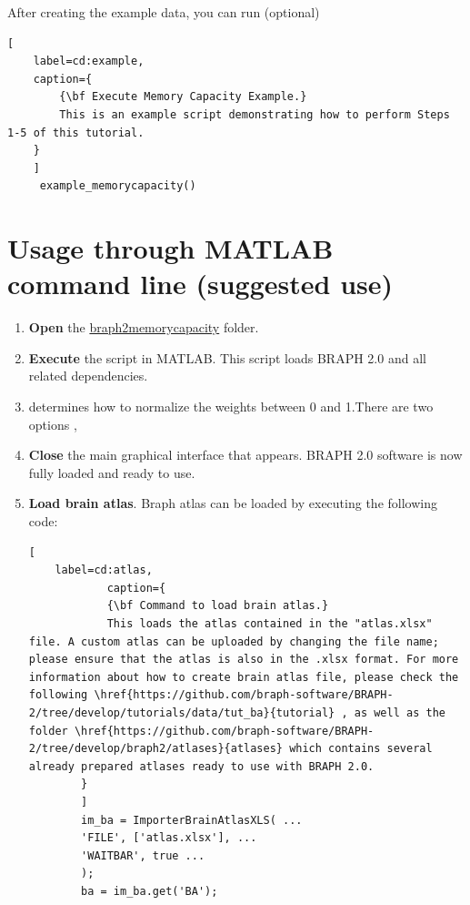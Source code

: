 \documentclass[justified]{tufte-handout}
\begin{document}
After creating the example data, you can run  (optional)

\begin{lstlisting}[
	label=cd:example,
	caption={
		{\bf Execute Memory Capacity Example.}
		This is an example script demonstrating how to perform Steps 1-5 of this tutorial.
	}
	]
	 example_memorycapacity()
\end{lstlisting}

\section{Usage through MATLAB command line (suggested use)}
\begin{enumerate}
	
	\item {\bf Open} the \href{https://github.com/braph-software/MemoryCapacity/tree/develop/braph2memorycapacity}{braph2memorycapacity}  folder.
	
	\item {\bf Execute} the  script in MATLAB. This script loads BRAPH 2.0 and all related dependencies.
	
	\item {} determines how to normalize the weights between 0 and 1.There are two options ,
	
	\item {\bf Close} the main graphical interface that appears. BRAPH 2.0 software is now fully loaded and ready to use.
	
	
	\item{\bf  Load brain atlas}. Braph atlas can be loaded by executing the following code:
	\begin{lstlisting}[
	label=cd:atlas,
			caption={
			{\bf Command to load brain atlas.}
			This loads the atlas contained in the "atlas.xlsx" file. A custom atlas can be uploaded by changing the file name; please ensure that the atlas is also in the .xlsx format. For more information about how to create brain atlas file, please check the following \href{https://github.com/braph-software/BRAPH-2/tree/develop/tutorials/data/tut_ba}{tutorial} , as well as the folder \href{https://github.com/braph-software/BRAPH-2/tree/develop/braph2/atlases}{atlases} which contains several already prepared atlases ready to use with BRAPH 2.0.
		}
		]
		im_ba = ImporterBrainAtlasXLS( ...
		'FILE', ['atlas.xlsx'], ...
		'WAITBAR', true ...
		);
		ba = im_ba.get('BA');
	\end{lstlisting}
	

\end{enumerate}
\end{document}
